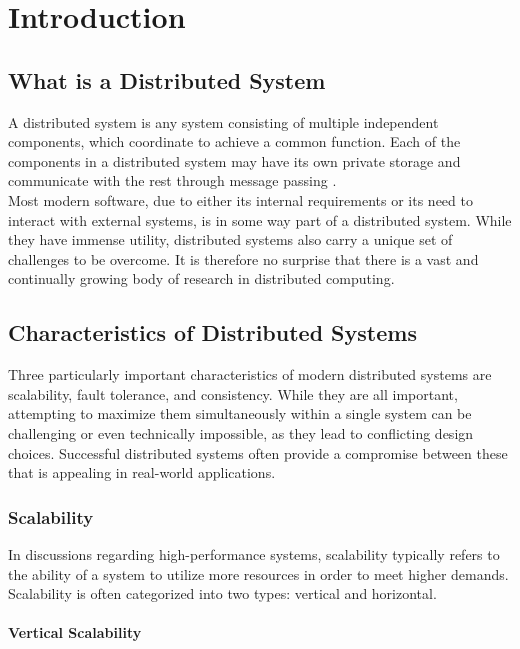 \chapter{Introduction}

\section{What is a Distributed System}
A distributed system is any system consisting of multiple independent components, which coordinate to achieve a common function. Each of the components in a distributed system may have its own private storage and communicate with the rest through message passing \cite{apt2009}.\\

Most modern software, due to either its internal requirements or its need to interact with external systems, is in some way part of a distributed system. While they have immense utility, distributed systems also carry a unique set of challenges to be overcome. It is therefore no surprise that there is a vast and continually growing body of research in distributed computing.

\section{Characteristics of Distributed Systems}

Three particularly important characteristics of modern distributed systems are scalability, fault tolerance, and consistency. While they are all important, attempting to maximize them simultaneously within a single system can be challenging or even technically impossible, as they lead to conflicting design choices. Successful distributed systems often provide a compromise between these that is appealing in real-world applications.

\subsection{Scalability}

In discussions regarding high-performance systems, scalability typically refers to the ability of a system to utilize more resources in order to meet higher demands. Scalability is often categorized into two types: vertical and horizontal.

\subsubsection{Vertical Scalability}

